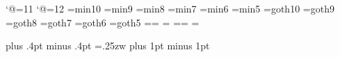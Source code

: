%
%

\catcode`@=11 %
\def\footnote#1{\let\@sf\empty %
  \ifhmode\edef\@sf{\spacefactor\the\spacefactor}\/\fi
  \nobreak#1\@sf\vfootnote{#1}}
\catcode`@=12 %
%
\font\tenmin=min10 %
\font\preloaded=min9
\font\preloaded=min8
\font\sevenmin=min7
\font\preloaded=min6
\font\fivemin=min5
%
\font\tengt=goth10 %
\font\preloaded=goth9
\font\preloaded=goth8
\font\sevengt=goth7
\font\preloaded=goth6
\font\fivegt=goth5
%
\newfam\minfam %
\newfam\gtfam  %
%
\def\mc{\fam\minfam\tenmin}%
\textfont\minfam=\tenmin\scriptfont\minfam=\sevenmin%
\scriptscriptfont\minfam=\fivemin
%
\def\gt{\fam\gtfam\tengt}%
\textfont\gtfam=\tengt\scriptfont\gtfam=\sevengt%
\scriptscriptfont\gtfam=\fivegt
%

\mc		  %
\kanjiskip=0pt plus .4pt minus .4pt
\xkanjiskip=.25zw plus 1pt minus 1pt
\autospacing\autoxspacing
{}
%
\def\fmtname{jplain}
\edef\fmtversion{\fmtversion\space j1.0b}
